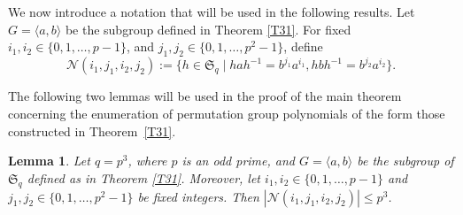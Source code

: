 \documentclass[11pt]{amsart}
\theoremstyle{plain}
\newtheorem{lem}[thm]{Lemma}
\numberwithin{equation}{section}
\begin{document}
We now introduce a notation that will be used in the following results. Let $G=\langle a,b\rangle $ be the subgroup defined in Theorem \ref{T31}. For fixed $i_1,i_2 \in  \{0,1,\ldots,p-1\}$, and $j_1,j_2 \in \{0,1,\ldots,p^{2}-1\}$, define 
\[
\mathcal{N}(i_1,j_1,i_2,j_2):=\{h \in \mathfrak{S}_q \mid hah^{-1}=b^{j_1}a^{i_1}, hbh^{-1}=b^{j_2}a^{i_2}\}.
\]

The following two lemmas will be used in the proof of the main theorem concerning the enumeration of permutation group polynomials of the form those constructed in Theorem~\ref{T31}.
\begin{lem}\label{Atmost_lemma_T31}
Let $q=p^3$, where $p$ is an odd prime, and $G=\langle a,b \rangle $ be the subgroup of $\mathfrak{S}_q$ defined as in Theorem \ref{T31}. Moreover, let $i_1,i_2 \in  \{0,1,\ldots,p-1\}$ and $j_1,j_2 \in \{0,1,\ldots,p^{2}-1\}$ be fixed integers. Then $|\mathcal{N}(i_1,j_1,i_2,j_2)| \leq  p^3$.
\end{lem}
\end{document}
